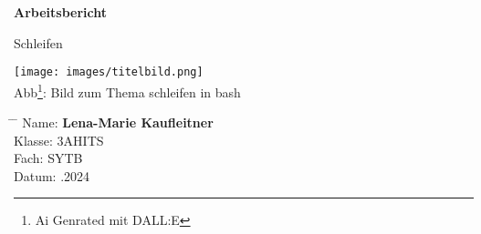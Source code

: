 \documentclass[12pt,a4paper]{article}
\begin{document}
    
    \begin{titlepage}
        \begin{center}
            \vspace*{3cm}
            
            \Huge
            \textbf{Arbeitsbericht}
            
            \vspace{0.3cm}
            \Huge
           Schleifen
            
            \vspace{0.8cm}
            \texttt{[image: images/titelbild.png]}\\
            \small
           Abb\footnote{Ai Genrated mit DALL:E}: Bild zum Thema schleifen in bash
            \small
            \vspace{0.5cm}
            \LARGE
            
            \vfill
            
            \Large
            \begin{tabbing}
                \hspace*{1em}\= \hspace*{8em} \= \kill %
                \> Name:\>  \textbf{Lena-Marie Kaufleitner} \\
                \> Klasse:\>  3AHITS \\
                \> Fach:\>  SYTB \\
                \> Datum: .2024 \\
            \end{tabbing}
        \end{center}
    \end{titlepage} 
    
    \tableofcontents
\end{document}
